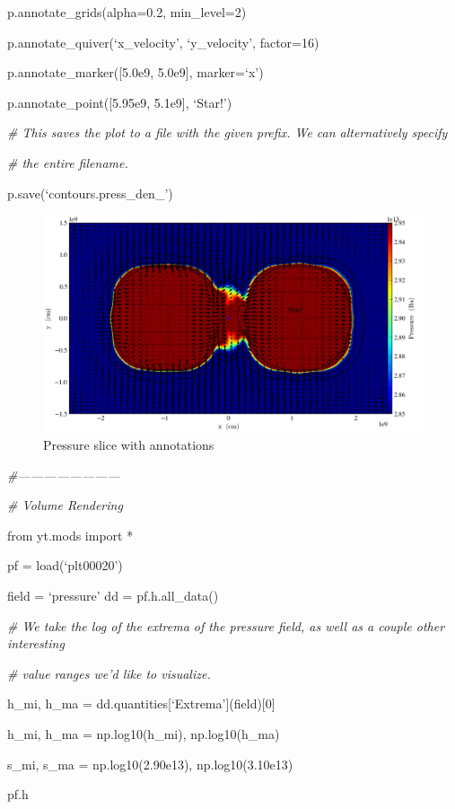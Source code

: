 p.annotate\_grids(alpha=0.2, min\_level=2)

p.annotate\_quiver(`x\_velocity', `y\_velocity', factor=16)

p.annotate\_marker([5.0e9, 5.0e9], marker=`x')

p.annotate\_point([5.95e9, 5.1e9], `Star!')

{\it\# This saves the plot to a file with the given prefix. We can alternatively specify}
{\setlength{\parskip}{0pt}

{\it\# the entire filename.}

p.save(`contours.press\_den\_')
}
\begin{figure}[h]
\centering
\includegraphics[width=6in]{Slice_z_pressure}
\caption{Pressure slice with annotations}
\end{figure}

{\it\#------------------------}


{\it\# Volume Rendering}
{\setlength{\parskip}{0pt}

from yt.mods import *
}

pf = load(`plt00020')

field = `pressure'
dd = pf.h.all\_data()

{\it\# We take the log of the extrema of the pressure field, as well as a couple other interesting}
{\setlength{\parskip}{0pt}

{\it\# value ranges we'd like to visualize.}

h\_mi, h\_ma = dd.quantities[`Extrema'](field)[0]
}

h\_mi, h\_ma = np.log10(h\_mi), np.log10(h\_ma)

s\_mi, s\_ma =  np.log10(2.90e13), np.log10(3.10e13)

pf.h

